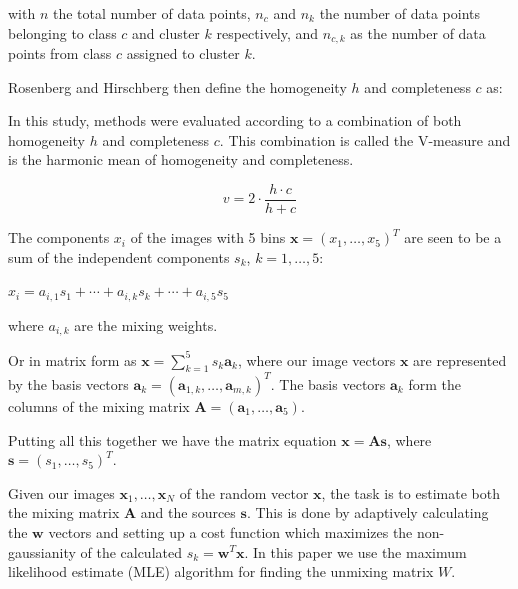\documentclass[a4paper,11pt]{article}
\begin{document}
with $n$ the total number of data points, $n_c$ and $n_k$ the number of data points belonging to class $c$ and cluster $k$ respectively, and $n_{c,k}$ as the number of data points from class $c$ assigned to cluster $k$.

Rosenberg and Hirschberg then define the homogeneity $h$ and completeness $c$ as:

    



In this study, methods were evaluated according to a combination of both homogeneity $h$ and completeness $c$. This combination is called the V-measure and is the harmonic mean of homogeneity and completeness.

\begin{equation}
v = 2 \cdot \frac{h \cdot c}{h + c}
\end{equation}

The components $x_i$ of the images with 5 bins $\boldsymbol{x}=(x_1,\ldots,x_5)^T$ are seen to be a sum of the independent components $s_k$, $k=1,\ldots,5$:

$x_i = a_{i,1} s_1 + \cdots + a_{i,k} s_k + \cdots + a_{i,5} s_5$

where $a_{i,k}$ are the mixing weights.

Or in matrix form as $\boldsymbol{x}=\sum_{k=1}^{5} s_k \boldsymbol{a}_k$, where our image vectors $\boldsymbol{x}$ are represented by the basis vectors $\boldsymbol{a}_k=(\boldsymbol{a}_{1,k},\ldots,\boldsymbol{a}_{m,k})^T$. The basis vectors $\boldsymbol{a}_k$ form the columns of the mixing matrix $\boldsymbol{A}=(\boldsymbol{a}_1,\ldots,\boldsymbol{a}_5)$.

Putting all this together we have the matrix equation $\boldsymbol{x}=\boldsymbol{A} \boldsymbol{s}$, where $\boldsymbol{s}=(s_1,\ldots,s_5)^T$.

Given our images $\boldsymbol{x}_1,\ldots,\boldsymbol{x}_N$ of the random vector $\boldsymbol{x}$, the task is to estimate both the mixing matrix $\boldsymbol{A}$ and the sources $\boldsymbol{s}$. This is done by adaptively calculating the $\boldsymbol{w}$ vectors and setting up a cost function which maximizes the non-gaussianity of the calculated $s_k = \boldsymbol{w}^T \boldsymbol{x}$. In this paper we use the maximum likelihood estimate (MLE) algorithm for finding the unmixing matrix $W$. 









\vfill









\end{document}
